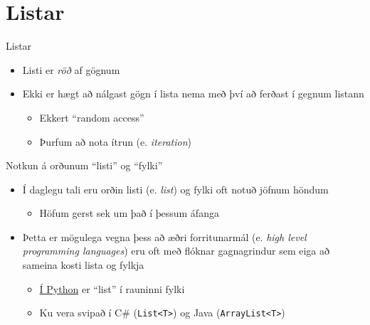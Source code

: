 \documentclass{beamer}
\begin{document}
\section{Listar}
\begin{frame}{Listar}
\begin{itemize}
 \item Listi er \emph{röð} af gögnum
 \item Ekki er hægt að nálgast gögn í lista nema með því að ferðast í gegnum listann
 \begin{itemize}
  \item Ekkert ``random access''
  \item Þurfum að nota ítrun (e. \emph{iteration})
 \end{itemize}
\end{itemize}
\end{frame}

\begin{frame}{Notkun á orðunum ``listi'' og ``fylki''}
\begin{itemize}
 \item Í daglegu tali eru orðin listi (e. \emph{list}) og fylki oft notuð jöfnum höndum
 \begin{itemize}
  \item Höfum gerst sek um það í þessum áfanga
 \end{itemize}
 \item Þetta er mögulega vegna þess að æðri forritunarmál (e. \emph{high level programming languages}) eru oft með flóknar gagnagrindur sem eiga að sameina kosti lista og fylkja
 \begin{itemize}
  \item \href{https://docs.python.org/3.5/faq/design.html\#how-are-lists-implemented}{Í Python} er ``list'' í rauninni fylki 
  \item Ku vera svipað í C\# (\texttt{List<T>}) og Java (\texttt{ArrayList<T>})
 \end{itemize}
\end{itemize}

\end{frame}
\end{document}
